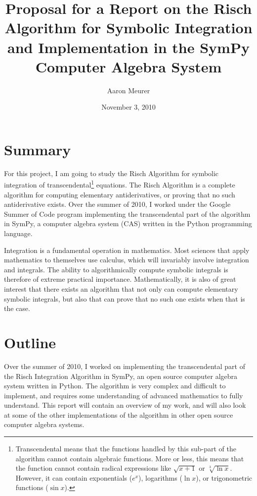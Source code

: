 \documentclass[12pt]{article}
\begin{document}
\title{Proposal for a Report on the Risch Algorithm for Symbolic
Integration and Implementation in the Sym\-Py Computer Algebra System}
\author{Aaron Meurer}
\date{November 3, 2010}
\maketitle
\tableofcontents
\section{Summary}
For this project, I am going to study the Risch Algorithm for symbolic
integration of transcendental\footnote{Transcendental means that the
functions handled by this sub-part of the algorithm cannot contain
algebraic functions. More or less, this means that the function cannot
contain radical expressions like $\sqrt{x + 1}$ or $\sqrt[3]{\ln{x}}$. 
However, it can contain exponentials ($e^x$), logarithms ($\ln{x}$), or
trigonometric functions ($\sin{x}$).} equations.  The Risch Algorithm is
a complete algorithm for computing elementary antiderivatives, or
proving that no such antiderivative exists.  Over the summer of 2010, I
worked under the Goo\-gle Summer of Code program implementing the
transcendental part of the algorithm in Sym\-Py, a computer algebra
system (CAS) written in the Py\-thon programming language.

Integration is a fundamental operation in mathematics.  Most sciences
that apply mathematics to themselves use calculus, which will invariably
involve integration and integrals.  The ability to algorithmically
compute symbolic integrals is therefore of extreme practical importance.
 Mathematically, it is also of great interest that there exists an
algorithm that not only can compute elementary symbolic integrals, but
also that can prove that no such one exists when that is the case.

\section{Outline}
Over the summer of 2010, I worked on implementing the
transcendental part of the Risch Integration Algorithm in
Sym\-Py, an open source computer algebra system written in Python.  The
algorithm is very complex and difficult to implement, and requires some
understanding of advanced mathematics to fully understand.  This report
will contain an overview of my work, and will also look at some of the
other implementations of the algorithm in other open source computer
algebra systems.
\end{document}
